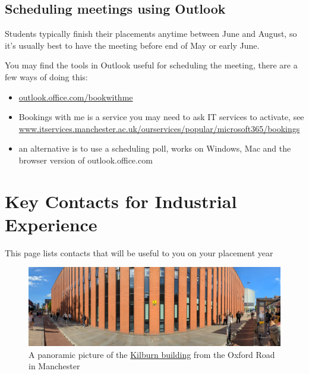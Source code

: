 \documentclass[
]{book}
\providecommand{\tightlist}{%
  \setlength{\itemsep}{0pt}\setlength{\parskip}{0pt}}
\begin{document}
\section{Scheduling meetings using Outlook}\label{schedule}

Students typically finish their placements anytime between June and August, so it's usually best to have the meeting before end of May or early June.

You may find the tools in Outlook useful for scheduling the meeting, there are a few ways of doing this:

\begin{itemize}
\tightlist
\item
  \href{https://outlook.office.com/bookwithme}{outlook.office.com/bookwithme}
\item
  Bookings with me is a service you may need to ask IT services to activate, see \href{https://www.itservices.manchester.ac.uk/ourservices/popular/microsoft365/bookings/}{www.itservices.manchester.ac.uk/ourservices/popular/microsoft365/bookings}
\item
  an alternative is to use a scheduling poll, works on Windows, Mac and the browser version of outlook.office.com \citep{poll}
\end{itemize}

\chapter{Key Contacts for Industrial Experience}\label{contacts}

This page lists contacts that will be useful to you on your placement year

\begin{figure}

{\centering \includegraphics[width=1\linewidth]{images/kilburnarama} 

}

\caption{A panoramic picture of the \href{https://en.wikipedia.org/wiki/Kilburn_Building}{Kilburn building} from the Oxford Road in Manchester}\label{fig:kilburn-fig}
\end{figure}
\end{document}
